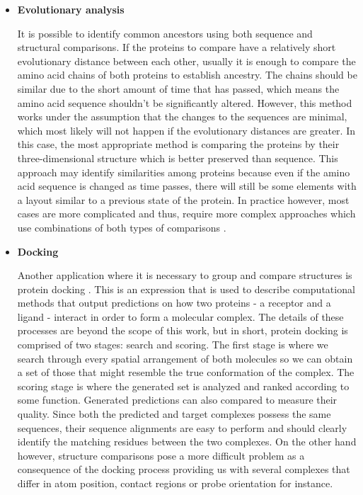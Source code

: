 \begin{itemize}

\item \textbf{Evolutionary analysis}

It is possible to identify common ancestors using both sequence and structural comparisons. If the proteins to compare have a relatively short evolutionary distance between each other, usually it is enough to compare the amino acid chains of both proteins to establish ancestry. The chains should be similar due to the short amount of time that has passed, which means the amino acid sequence shouldn't be significantly altered. However, this method works under the assumption that the changes to the sequences are minimal, which most likely will not happen if the evolutionary distances are greater. In this case, the most appropriate method is comparing the proteins by their three-dimensional structure which is better preserved than sequence. This approach may identify similarities among proteins because even if the amino acid sequence is changed as time passes, there will still be some elements with a layout similar to a previous state of the protein. In practice however, most cases are more complicated and thus, require more complex approaches which use combinations of both types of comparisons \cite{burkowski2008structural} \cite{holm1996mapping}. 

\item \textbf{Docking}

Another application where it is necessary to group and compare structures is protein docking \cite{halperin2002principles}. This is an expression that is used to describe computational methods that output predictions on how two proteins - a receptor and a ligand - interact in order to form a molecular complex. The details of these processes are beyond the scope of this work, but in short, protein docking is comprised of two stages: search and scoring. The first stage is where we search through every spatial arrangement of both molecules so we can obtain a set of those that might resemble the true conformation of the complex. The scoring stage is where the generated set is analyzed and ranked according to some function. Generated predictions can also compared to measure their quality. Since both the predicted and target complexes possess the same sequences, their sequence alignments are easy to perform and should clearly identify the matching residues between the two complexes. On the other hand however, structure comparisons pose a more difficult problem as a consequence of the docking process providing us with several complexes that differ in atom position, contact regions or probe orientation for instance.


\end{itemize}
